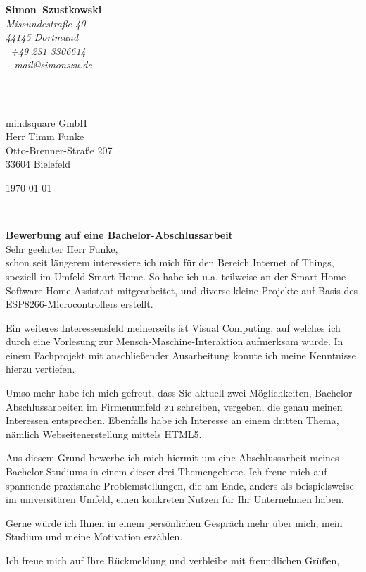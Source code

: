 \documentclass[11pt,a4paper]{article}
\def\firstname{Simon}
\def\familyname{Szustkowski}
\begin{document}
\sffamily   %
\hfill%
\begin{minipage}[t]{.6\textwidth}
	\raggedleft%
	{\bfseries {\color{firstnamecolor}\firstname}~{\color{familynamecolor}\familyname}}\\[.35ex]
	\small\itshape%
	Missundestraße 40\\
	44145 Dortmund\\[.35ex]
	\Mobilefone~+49 231 3306614\\
	\Letter~ mail@simonszu.de
\end{minipage}\\[0.5em]
%
{\color{firstnamecolor}\rule{\textwidth}{.25ex}}
%
\begin{minipage}[t]{.4\textwidth}
	\raggedright%
	\vspace*{1em}
	mindsquare GmbH\\[.35ex]
	\small%
	Herr Timm Funke\\
	Otto-Brenner-Straße 207\\
	33604 Bielefeld
\end{minipage}
%
\hfill
%
\begin{minipage}[t]{.4\textwidth}
	\raggedleft %
	\today
\end{minipage}\\[1em]
\raggedright

{\bfseries \color{familynamecolor}Bewerbung auf eine Bachelor-Abschlussarbeit}\\[1.5em]

Sehr geehrter Herr Funke,\\[1em]
%
schon seit längerem interessiere ich mich für den Bereich Internet of Things, speziell im Umfeld Smart Home. So habe ich u.a. teilweise an der Smart Home Software \glqq Home Assistant\grqq{} mitgearbeitet, und diverse kleine Projekte auf Basis des ESP8266-Microcontrollers erstellt. 
\par
Ein weiteres Interessensfeld meinerseits ist Visual Computing, auf welches ich durch eine Vorlesung zur Mensch-Maschine-Interaktion aufmerksam wurde. In einem Fachprojekt mit anschließender Ausarbeitung konnte ich meine Kenntnisse hierzu vertiefen. 
\par
Umso mehr habe ich mich gefreut, dass Sie aktuell zwei Möglichkeiten, Bachelor-Abschlussarbeiten im Firmenumfeld zu schreiben, vergeben, die genau meinen Interessen entsprechen. Ebenfalls habe ich Interesse an einem dritten Thema, nämlich Webseitenerstellung mittels HTML5. 
\par
Aus diesem Grund bewerbe ich mich hiermit um eine Abschlussarbeit meines Bachelor-Studiums in einem dieser drei Themengebiete. Ich freue mich auf spannende praxisnahe Problemstellungen, die am Ende, anders als beispielsweise im universitären Umfeld, einen konkreten Nutzen für Ihr Unternehmen haben. 
\par
Gerne würde ich Ihnen in einem persönlichen Gespräch mehr über mich, mein Studium und meine Motivation erzählen.
\par
Ich freue mich auf Ihre Rückmeldung und verbleibe mit freundlichen Grüßen, \\[3em]
\end{document}
